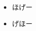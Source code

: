 \documentclass{jsarticle}
\begin{document}
  \begin{itemize}
    \item ほげー
    \item げほー
  \end{itemize}
\end{document}
